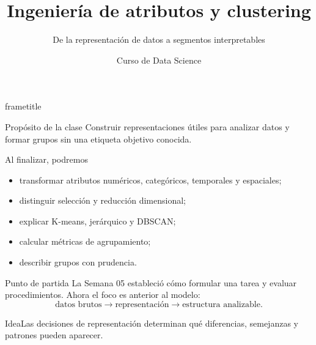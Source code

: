 \documentclass[aspectratio=169,10pt]{beamer}
\title[Data Science · Clase 6]{Ingeniería de atributos y clustering}
\subtitle{De la representación de datos a segmentos interpretables}
\author{Curso de Data Science}
\institute{Semana 6 · Clase 6}
\date{}
\begin{document}
\begin{frame}[plain]
\begin{beamercolorbox}[wd=\paperwidth,ht=\paperheight,sep=2em]{frametitle}
\vfill {\Huge\bfseries\inserttitle\par}\vspace{.45em}{\color{UAPGold}\Large\insertsubtitle\par}\vspace{1.1em}
\par\vfill {\color{UAPGold}\large\insertauthor\par}{\color{white}\insertinstitute\par}
\end{beamercolorbox}
\end{frame}

\begin{frame}{Propósito de la clase}
Construir representaciones útiles para analizar datos y formar grupos sin una etiqueta objetivo conocida.
\begin{block}{Al finalizar, podremos}\begin{itemize}
\item transformar atributos numéricos, categóricos, temporales y espaciales;\item distinguir selección y reducción dimensional;\item explicar K-means, jerárquico y DBSCAN;\item calcular métricas de agrupamiento;\item describir grupos con prudencia.
\end{itemize}\end{block}
\end{frame}

\begin{frame}{Punto de partida}
\small La Semana 05 estableció cómo formular una tarea y evaluar procedimientos. Ahora el foco es anterior al modelo:
\[\text{datos brutos}\rightarrow\text{representación}\rightarrow\text{estructura analizable}.\]
\begin{block}{Idea}Las decisiones de representación determinan qué diferencias, semejanzas y patrones pueden aparecer.\end{block}
\end{frame}
\end{document}
